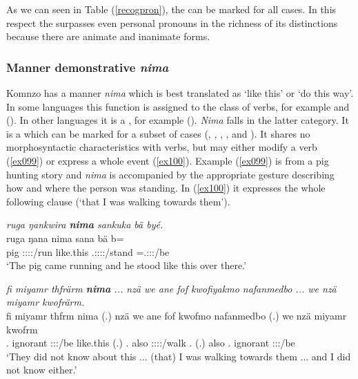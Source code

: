 As we can seen in Table (\ref{recogpron}), the  can be marked for all cases. In this respect the  surpasses even personal pronouns in the richness of its distinctions because there are animate and inanimate  forms.

\subsubsection{Manner demonstrative \emph{nima}} \label{manner-den-adv-nima}

Komnzo has a manner  \emph{nima} which is best translated as `like this' or `do this way'. In some languages this function is assigned to the class of verbs, for example  and  (\citealt[72]{Dixon:2003dj}). In other languages it is a , for example  (\citealt[214]{Evans:1995uf}). \emph{Nima} falls in the latter category. It is a  which can be marked for a subset of cases (, , , , and ). It shares no morphosyntactic characteristics with verbs, but may either modify a verb (\ref{ex099}) or express a whole event (\ref{ex100}). Example (\ref{ex099}) is from a pig hunting story and \emph{nima} is accompanied by the appropriate gesture describing how and where the person was standing. In (\ref{ex100}) it expresses the whole following clause (`that I was walking towards them').

\begin{exe}
	\ex \emph{ruga ŋankwira \textbf{nima} sankuka bä byé.}\\
	\gll ruga ŋana nima sana bä b=\\
	pig \Stsg:\Sbj:\Pst:\Ipfv:\Venit/run {like.this} \Tsg{}.\Masc{}:\Sbj:\Pst:\Pfv:\Venit/stand \Med{} \Med{}=\Tsg{}.\Masc{}:\Sbj:\Nonpast:\Ipfv/be\\
	\trans `The pig came running and he stood like this over there.'\\
	\label{ex099}
\end{exe}
\begin{exe}
	\ex \emph{fi miyamr thfrärm \textbf{nima} ... nzä we ane fof kwofiyakmo nafanmedbo ... we nzä miyamr kwofrärm.}\\
	\gll fi miyamr thfrm nima (.) nzä we ane fof kwofmo nafanmedbo (.) we nzä miyamr kwofrm\\
	\Third{}.\Abs{} ignorant \Stpl:\Sbj:\Pst:\Dur/be {like.this} (.) \Fsg{}.\Abs{} also \Dem{} \Emph{} \Fsg:\Sbj:\Pst:\Dur:\Andat/walk \Third{}\Nsg{}.\All{} (.) also \Fsg{}.\Abs{} ignorant \Fsg:\Sbj:\Pst:\Dur/be\\
	\trans `They did not know about this ... (that) I was walking towards them ... and I did not know either.'
	\label{ex100}
\end{exe}

